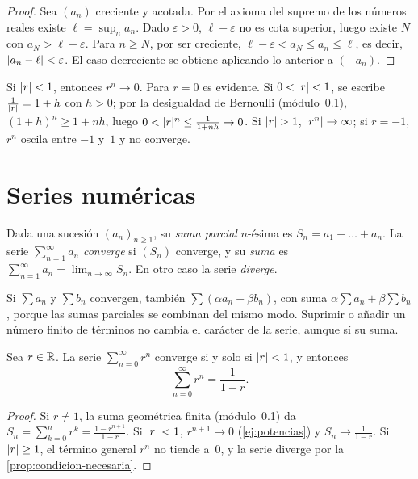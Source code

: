 \begin{proof}
Sea $(a_n)$ creciente y acotada. Por el axioma del supremo de los números reales existe $\ell=\sup_n a_n$. Dado $\varepsilon>0$, $\ell-\varepsilon$ no es cota superior, luego existe $N$ con $a_N>\ell-\varepsilon$. Para $n\ge N$, por ser creciente, $\ell-\varepsilon<a_N\le a_n\le\ell$, es decir, $\lvert a_n-\ell\rvert<\varepsilon$. El caso decreciente se obtiene aplicando lo anterior a $(-a_n)$.
\end{proof}

\begin{ejemplo}[Potencias]\label{ej:potencias}
Si $\lvert r\rvert<1$, entonces $r^{n}\to0$. Para $r=0$ es evidente. Si $0<\lvert r\rvert<1$, se escribe $\frac{1}{\lvert r\rvert}=1+h$ con $h>0$; por la desigualdad de Bernoulli (módulo~0.1), $(1+h)^{n}\ge1+nh$, luego $0<\lvert r\rvert^{n}\le\frac{1}{1+nh}\to0$. Si $\lvert r\rvert>1$, $\lvert r^{n}\rvert\to\infty$; si $r=-1$, $r^{n}$ oscila entre $-1$ y~$1$ y no converge.
\end{ejemplo}

\section{Series numéricas}

\begin{definicion}[Serie]\label{def:serie}
Dada una sucesión $(a_n)_{n\ge1}$, su \emph{suma parcial} $n$-ésima es $S_n=a_1+\dots+a_n$. La serie $\sum_{n=1}^{\infty}a_n$ \emph{converge} si $(S_n)$ converge, y su \emph{suma} es $\sum_{n=1}^{\infty}a_n=\lim_{n\to\infty}S_n$. En otro caso la serie \emph{diverge}.
\end{definicion}

Si $\sum a_n$ y $\sum b_n$ convergen, también $\sum(\alpha a_n+\beta b_n)$, con suma $\alpha\sum a_n+\beta\sum b_n$, porque las sumas parciales se combinan del mismo modo. Suprimir o añadir un número finito de términos no cambia el carácter de la serie, aunque sí su suma.

\begin{teorema}\label{teo:geometrica}
Sea $r\in\mathbb{R}$. La serie $\sum_{n=0}^{\infty}r^{n}$ converge si y solo si $\lvert r\rvert<1$, y entonces
\[
\sum_{n=0}^{\infty}r^{n}=\frac{1}{1-r}.
\]
\end{teorema}

\begin{proof}
Si $r\neq1$, la suma geométrica finita (módulo~0.1) da $S_n=\sum_{k=0}^{n}r^{k}=\frac{1-r^{n+1}}{1-r}$. Si $\lvert r\rvert<1$, $r^{n+1}\to0$ (\cref{ej:potencias}) y $S_n\to\frac{1}{1-r}$. Si $\lvert r\rvert\ge1$, el término general $r^{n}$ no tiende a~$0$, y la serie diverge por la \cref{prop:condicion-necesaria}.
\end{proof}

